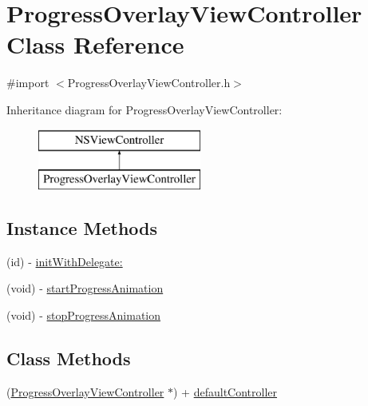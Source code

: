 \hypertarget{interface_progress_overlay_view_controller}{\section{Progress\-Overlay\-View\-Controller Class Reference}
\label{interface_progress_overlay_view_controller}
}


{\ttfamily \#import $<$Progress\-Overlay\-View\-Controller.\-h$>$}

Inheritance diagram for Progress\-Overlay\-View\-Controller\-:\begin{figure}[H]
\begin{center}
\leavevmode
\includegraphics[height=2.000000cm]{interface_progress_overlay_view_controller}
\end{center}
\end{figure}
\subsection*{Instance Methods}
\begin{DoxyCompactItemize}
\item 
(id) -\/ \hyperlink{interface_progress_overlay_view_controller_a31987d71b58e0520588676a4f6896d2c}{init\-With\-Delegate\-:}
\item 
(void) -\/ \hyperlink{interface_progress_overlay_view_controller_a76f768a1588a3dee3d0ae08939156996}{start\-Progress\-Animation}
\item 
(void) -\/ \hyperlink{interface_progress_overlay_view_controller_a6c377016e2cceb931938a3086da5f808}{stop\-Progress\-Animation}
\end{DoxyCompactItemize}
\subsection*{Class Methods}
\begin{DoxyCompactItemize}
\item 
(\hyperlink{interface_progress_overlay_view_controller}{Progress\-Overlay\-View\-Controller} $\ast$) + \hyperlink{interface_progress_overlay_view_controller_a9a003421cf639ab427eb0e6d395a2e39}{default\-Controller}
\end{DoxyCompactItemize}
